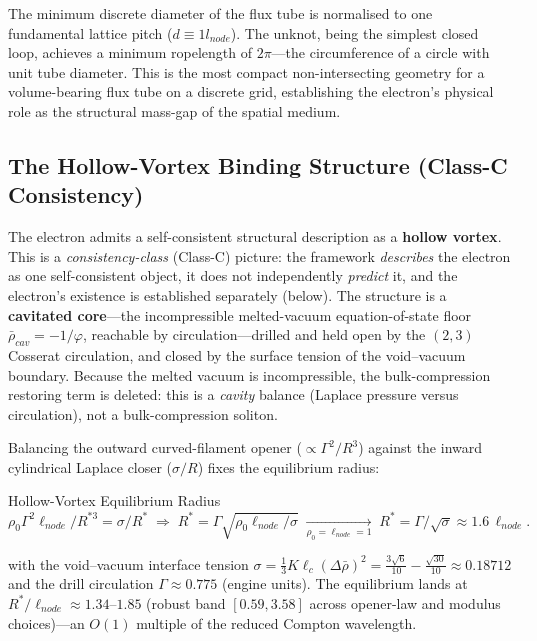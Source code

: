 The minimum discrete diameter of the flux tube is normalised to one fundamental lattice pitch ($d \equiv 1 l_{node}$). The unknot, being the simplest closed loop, achieves a minimum ropelength of $2\pi$---the circumference of a circle with unit tube diameter. This is the most compact non-intersecting geometry for a volume-bearing flux tube on a discrete grid, establishing the electron's physical role as the structural mass-gap of the spatial medium.

\subsection{The Hollow-Vortex Binding Structure (Class-C Consistency)}
\label{sec:hollow_vortex_binding}
The electron admits a self-consistent structural description as a \textbf{hollow vortex}. This is a \emph{consistency-class} (Class-C) picture: the framework \emph{describes} the electron as one self-consistent object, it does not independently \emph{predict} it, and the electron's existence is established separately (below). The structure is a \textbf{cavitated core}---the incompressible melted-vacuum equation-of-state floor $\bar\rho_{cav} = -1/\varphi$, reachable by circulation---drilled and held open by the $(2,3)$ Cosserat circulation, and closed by the surface tension of the void--vacuum boundary. Because the melted vacuum is incompressible, the bulk-compression restoring term is deleted: this is a \emph{cavity} balance (Laplace pressure versus circulation), not a bulk-compression soliton.

Balancing the outward curved-filament opener ($\propto \Gamma^2/R^3$) against the inward cylindrical Laplace closer ($\sigma/R$) fixes the equilibrium radius:
\begin{resultbox}{Hollow-Vortex Equilibrium Radius}
\begin{equation}
    \rho_0 \Gamma^2 \ell_{node}/R^{*3} = \sigma/R^{*}
    \;\Rightarrow\;
    R^{*} = \Gamma\sqrt{\rho_0 \ell_{node}/\sigma}
    \;\xrightarrow[\rho_0 = \ell_{node} = 1]{}\;
    R^{*} = \Gamma/\sqrt{\sigma} \approx 1.6\,\ell_{node} .
    \label{eq:hollow_vortex_radius}
\end{equation}
\end{resultbox}
with the void--vacuum interface tension $\sigma = \tfrac13 K \ell_c (\Delta\bar\rho)^2 = \tfrac{3\sqrt6}{10} - \tfrac{\sqrt{30}}{10} \approx 0.18712$ and the drill circulation $\Gamma \approx 0.775$ (engine units). The equilibrium lands at $R^{*}/\ell_{node} \approx 1.34$--$1.85$ (robust band $[0.59, 3.58]$ across opener-law and modulus choices)---an $O(1)$ multiple of the reduced Compton wavelength.


